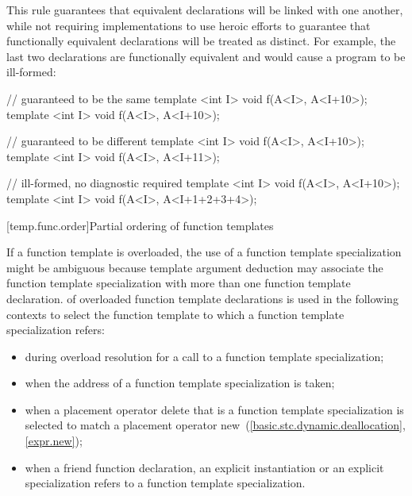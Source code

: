 \pnum
\begin{note}
This rule guarantees that equivalent declarations will be linked with
one another, while not requiring implementations to use heroic efforts
to guarantee that functionally equivalent declarations will be treated
as distinct.
For example, the last two declarations are functionally
equivalent and would cause a program to be ill-formed:

\begin{codeblock}
// guaranteed to be the same
template <int I> void f(A<I>, A<I+10>);
template <int I> void f(A<I>, A<I+10>);

// guaranteed to be different
template <int I> void f(A<I>, A<I+10>);
template <int I> void f(A<I>, A<I+11>);

// ill-formed, no diagnostic required
template <int I> void f(A<I>, A<I+10>);
template <int I> void f(A<I>, A<I+1+2+3+4>);
\end{codeblock}
\end{note}

[temp.func.order]{Partial ordering of function templates}

\pnum
{}%
%
If a function template is overloaded,
the use of a function template specialization might be ambiguous because
template argument deduction may associate the function
template specialization with more than one function template declaration.
of overloaded function template declarations is used in the following contexts
to select the function template to which a function template specialization
refers:

\begin{itemize}
\item
during overload resolution for a call to a function template specialization;
\item
when the address of a function template specialization is taken;
\item
when a placement operator delete that is a
function template
specialization
is selected to match a placement operator new~(\ref{basic.stc.dynamic.deallocation}, \ref{expr.new});
\item
when a friend function declaration, an
explicit instantiation or an explicit specialization refers to
a function template specialization.
\end{itemize}

